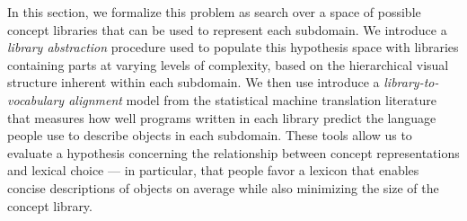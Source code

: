\documentclass[10pt,letterpaper]{article}
\begin{document}
In this section, we formalize this problem as search over a space of possible concept libraries that can be used to represent each subdomain. We introduce a \textit{library abstraction} procedure used to populate this hypothesis space with libraries containing parts at varying levels of complexity, based on the hierarchical visual structure inherent within each subdomain. We then use introduce a \textit{library-to-vocabulary alignment} model from the statistical machine translation literature that measures how well programs written in each library predict the language people use to describe objects in each subdomain.
These tools allow us to evaluate a hypothesis concerning the relationship between concept representations and lexical choice --- in particular, that people favor a lexicon that enables concise descriptions of objects on average while also minimizing the size of the concept library.




\end{document}
